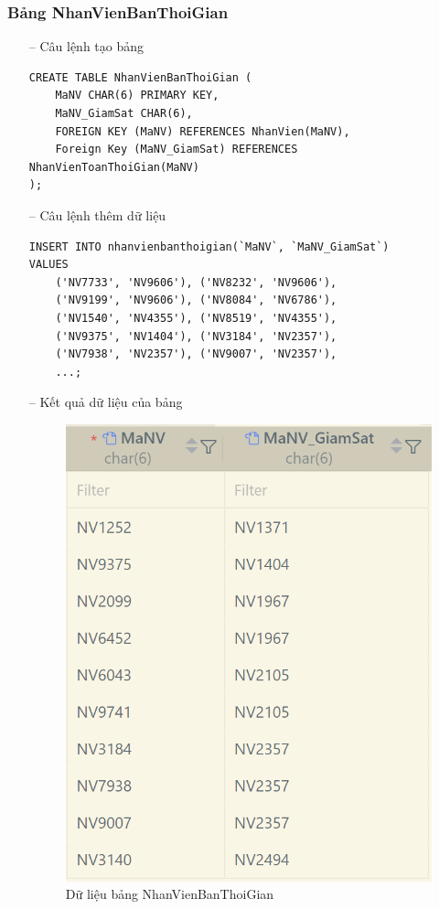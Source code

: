 \subsubsection{Bảng NhanVienBanThoiGian}
\begin{itemize}
    \item [--] Câu lệnh tạo bảng
   \begin{verbatim}
CREATE TABLE NhanVienBanThoiGian (
    MaNV CHAR(6) PRIMARY KEY,
    MaNV_GiamSat CHAR(6),
    FOREIGN KEY (MaNV) REFERENCES NhanVien(MaNV),
    Foreign Key (MaNV_GiamSat) REFERENCES NhanVienToanThoiGian(MaNV)
);
    \end{verbatim}
    \item [--] Câu lệnh thêm dữ liệu
   \begin{verbatim}
INSERT INTO nhanvienbanthoigian(`MaNV`, `MaNV_GiamSat`)
VALUES
    ('NV7733', 'NV9606'), ('NV8232', 'NV9606'),
    ('NV9199', 'NV9606'), ('NV8084', 'NV6786'),
    ('NV1540', 'NV4355'), ('NV8519', 'NV4355'),
    ('NV9375', 'NV1404'), ('NV3184', 'NV2357'),
    ('NV7938', 'NV2357'), ('NV9007', 'NV2357'),
    ...;
    \end{verbatim}
    \item [--] Kết quả dữ liệu của bảng
    \begin{figure}[H]
        \centering
        \includegraphics[width=0.45\linewidth]{content/images/data_nvparttime.png}
        \caption{Dữ liệu bảng NhanVienBanThoiGian}
        \label{fig:data_nvparttime}
    \end{figure}
\end{itemize}
\newpage
